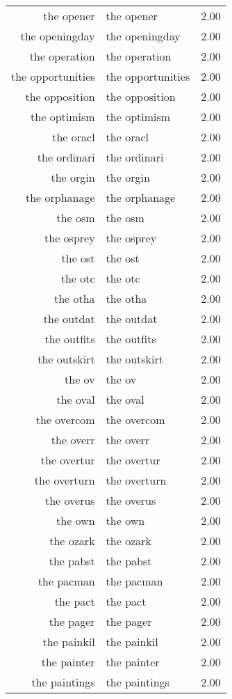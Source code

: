 \begin{table}[ht]
\begin{tabular}{rlr}
  the opener & the opener & 2.00 \\ 
  the openingday & the openingday & 2.00 \\ 
  the operation & the operation & 2.00 \\ 
  the opportunities & the opportunities & 2.00 \\ 
  the opposition & the opposition & 2.00 \\ 
  the optimism & the optimism & 2.00 \\ 
  the oracl & the oracl & 2.00 \\ 
  the ordinari & the ordinari & 2.00 \\ 
  the orgin & the orgin & 2.00 \\ 
  the orphanage & the orphanage & 2.00 \\ 
  the osm & the osm & 2.00 \\ 
  the osprey & the osprey & 2.00 \\ 
  the ost & the ost & 2.00 \\ 
  the otc & the otc & 2.00 \\ 
  the otha & the otha & 2.00 \\ 
  the outdat & the outdat & 2.00 \\ 
  the outfits & the outfits & 2.00 \\ 
  the outskirt & the outskirt & 2.00 \\ 
  the ov & the ov & 2.00 \\ 
  the oval & the oval & 2.00 \\ 
  the overcom & the overcom & 2.00 \\ 
  the overr & the overr & 2.00 \\ 
  the overtur & the overtur & 2.00 \\ 
  the overturn & the overturn & 2.00 \\ 
  the overus & the overus & 2.00 \\ 
  the own & the own & 2.00 \\ 
  the ozark & the ozark & 2.00 \\ 
  the pabst & the pabst & 2.00 \\ 
  the pacman & the pacman & 2.00 \\ 
  the pact & the pact & 2.00 \\ 
  the pager & the pager & 2.00 \\ 
  the painkil & the painkil & 2.00 \\ 
  the painter & the painter & 2.00 \\ 
  the paintings & the paintings & 2.00 \\ 

\end{tabular}
\end{table}

